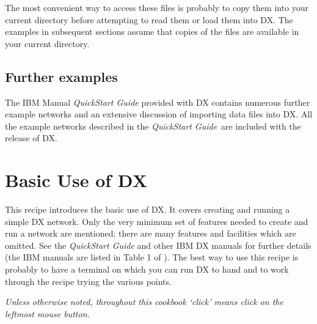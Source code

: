 The most convenient way to access these files is probably to copy them
into your current directory before attempting to read them or load
them into DX.  The examples in subsequent sections assume that copies
of the files are available in your current directory.

\subsection{Further examples}

The IBM Manual {\it QuickStart Guide}\cite{QUICKS} provided with DX contains
numerous further example networks and an extensive discussion of
importing data files into DX. All the example networks described in the
{\it QuickStart Guide}\, are included with the release of DX.


\newpage
\section{\label{BASIC}Basic Use of DX}

This recipe introduces the basic use of DX. It covers creating and
running a simple DX network. Only the very minimum set of features needed
to create and run a network are mentioned; there are many features and
facilities which are omitted. See the {\it QuickStart Guide}\cite{QUICKS}
and other IBM DX manuals for further details (the IBM manuals are listed
in Table 1 of \cite{SUN203}). The best way to use 
this recipe is probably to have a terminal on which you can run DX to
hand and to work through the recipe trying the various points.

{\it Unless otherwise noted, throughout this cookbook `click' means click
on the leftmost mouse button.}

